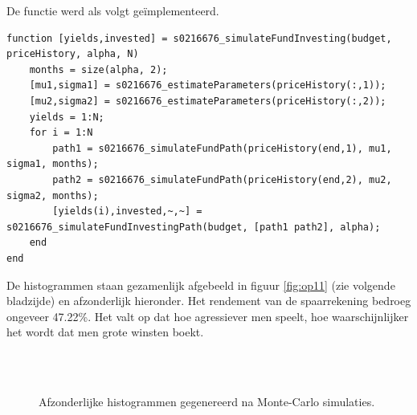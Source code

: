 \vspace*{\fill}

\restoregeometry



De functie werd als volgt ge\"implementeerd.

\begin{lstlisting}
function [yields,invested] = s0216676_simulateFundInvesting(budget, priceHistory, alpha, N)
    months = size(alpha, 2);
    [mu1,sigma1] = s0216676_estimateParameters(priceHistory(:,1));
    [mu2,sigma2] = s0216676_estimateParameters(priceHistory(:,2));
    yields = 1:N;
    for i = 1:N
        path1 = s0216676_simulateFundPath(priceHistory(end,1), mu1, sigma1, months);
        path2 = s0216676_simulateFundPath(priceHistory(end,2), mu2, sigma2, months);
        [yields(i),invested,~,~] = s0216676_simulateFundInvestingPath(budget, [path1 path2], alpha);
    end
end
\end{lstlisting}



De histogrammen staan gezamenlijk afgebeeld in figuur \ref{fig:op11} (zie volgende bladzijde) en afzonderlijk hieronder. Het rendement van de spaarrekening bedroeg ongeveer 47.22\%. Het valt op dat hoe agressiever men speelt, hoe waarschijnlijker het wordt dat men grote winsten boekt.

\begin{figure}[h]
\centering
{}\\
\\
\caption{Afzonderlijke histogrammen gegenereerd na Monte-Carlo simulaties.}%
\label{fig:op11sep}
\end{figure}

